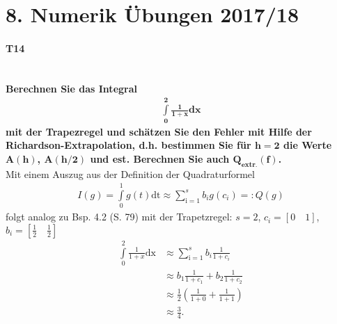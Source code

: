 \documentclass[10pt,a4paper]{article}
\begin{document}
	\section*{8. Numerik Übungen 2017/18}
	\paragraph{T14}\mbox{}\\
	\textbf{%
		Berechnen Sie das Integral
		\begin{align*}
			\mathbf{\int\limits_{0}^{2}\frac{1}{1+x}\text{dx}}
		\end{align*}
		mit der Trapezregel und schätzen Sie den Fehler mit Hilfe der Richardson-Extrapolation, d.h. bestimmen Sie für $\mathbf{h=2}$ die Werte $\mathbf{A(h)}$, $\mathbf{A(h/2)}$ und est. Berechnen Sie auch $\mathbf{Q_\text{extr.}(f)}$.
	}\\
	Mit einem Auszug aus der Definition der Quadraturformel
	\begin{align*}\tag{(4.12)}
		I(g)=\int\limits_{0}^{1}g(t)\text{dt} \approx \sum\limits_{\text{i}=1}^{s}b_ig(c_i)=:Q(g)
	\end{align*}
	folgt analog zu Bsp. 4.2 (S. 79) mit der Trapetzregel: $s = 2$, $c_i=[0 \quad 1]$, $b_i = [\frac{1}{2} \quad \frac{1}{2}]$
	\begin{align*}
		\int\limits_{0}^{2}\frac{1}{1+x}\text{dx} &\approx \sum\limits_{\text{i}=1}^{s} b_i \frac{1}{1+c_i}\\
		 & \approx b_1 \frac{1}{1+c_1}+ b_2 \frac{1}{1+c_2} \\
		 & \approx \frac{1}{2} \left( \frac{1}{1+0}+ \frac{1}{1+1} \right) \\
		 & \approx \frac{3}{4}.
	\end{align*}
	
\end{document}
